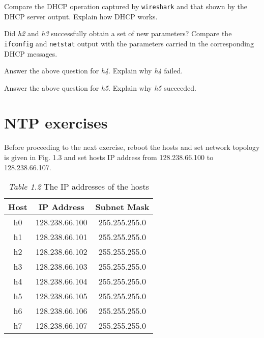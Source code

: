 \documentclass{../UTNetLab}
\begin{document}
    \begin{report}
    \item Compare the DHCP operation captured by \lstinline{wireshark} and that shown by the DHCP server output.
    Explain how DHCP works.
    
    \item Did \textit{h2} and \textit{h3} successfully obtain a set of new parameters?
    Compare the \lstinline{ifconfig} and \lstinline{netstat} output with the parameters carried in the corresponding DHCP messages.
    
    \item Answer the above question for \textit{h4}.
    Explain why \textit{h4} failed.
    
    \item Answer the above question for \textit{h5}.
    Explain why \textit{h5} succeeded.
    \end{report}

\part{NTP exercises}
    Before proceeding to the next exercise, reboot the hosts and set network topology is given in Fig. 1.3 and set hosts IP address from 128.238.66.100 to 128.238.66.107.
    \begin{center}
        \begin{minipage}{0.48\textwidth}
            \begin{flushleft}
                \begin{table}[H]
                    \caption{\textit{Table 1.2} The IP addresses of the hosts}
                    \centering
                    \begin{tabular}{ c c c }
                        \hline \hline
                        Host & IP Address & Subnet Mask \\
                        \hline 
                        h0 & 128.238.66.100 & 255.255.255.0 \\
                        h1 & 128.238.66.101 & 255.255.255.0 \\
                        h2 & 128.238.66.102 & 255.255.255.0 \\
                        h3 & 128.238.66.103 & 255.255.255.0 \\
                        h4 & 128.238.66.104 & 255.255.255.0 \\
                        h5 & 128.238.66.105 & 255.255.255.0 \\
                        h6 & 128.238.66.106 & 255.255.255.0 \\
                        h7 & 128.238.66.107 & 255.255.255.0 \\
                        \hline \hline
                        \end{tabular}
                \end{table}
            \end{flushleft}
        \end{minipage}
    \end{center}
\end{document}
